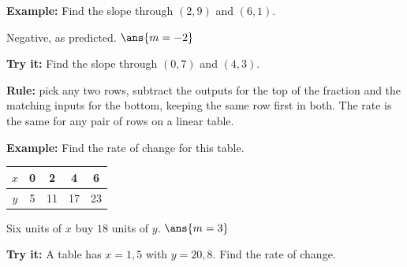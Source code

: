 \documentclass[12pt]{article}
\begin{document}
\begin{examplebox}
\textbf{Example:} \quad Find the slope through $(2, 9)$ and $(6, 1)$.

Negative, as predicted. \quad $\ans{m = -2}$
\end{examplebox}

\begin{tryitbox}
\textbf{Try it:} \quad Find the slope through $(0, 7)$ and $(4, 3)$.\\[2pt]
\end{tryitbox}


\begin{formulabox}
\textbf{Rule:} pick any two rows, subtract the outputs for the top of the
fraction and the matching inputs for the bottom, keeping the same row first
in both. The rate is the same for any pair of rows on a linear table.
\end{formulabox}

\begin{examplebox}
\textbf{Example:} \quad Find the rate of change for this table.
\begin{center}
\begin{tabular}{|c|c|c|c|c|}
\hline
$x$ & 0 & 2 & 4 & 6 \\ \hline
$y$ & 5 & 11 & 17 & 23 \\ \hline
\end{tabular}
\end{center}

Six units of $x$ buy $18$ units of $y$. \quad $\ans{m = 3}$
\end{examplebox}

\begin{tryitbox}
\textbf{Try it:} \quad A table has $x = 1, 5$ with $y = 20, 8$. Find the rate
of change.\\[2pt]
\end{tryitbox}
\end{document}

